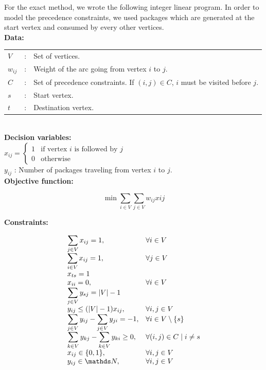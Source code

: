 \documentclass[]{article}
\begin{document}
    For the exact method, we wrote the following integer linear program. In order to model the precedence constraints, we used packages which are generated at the start vertex and consumed by every other vertices.\\
    
    \textbf{Data:}\\
    
    \begin{tabular}{lll}
	    $V$ & : & Set of vertices.\\ 
	    $w_{ij}$ & : & Weight of the arc going from vertex $i$ to $j$.\\
	    $C$ & : & Set of precedence constraints. If $(i,j) \in C$, $i$ must be visited before $j$.\\
	    $s$ & : & Start vertex.\\
	    $t$ & : & Destination vertex.
	\end{tabular}\\
    
    \textbf{Decision variables:}\\
    
    $x_{ij} = \begin{cases}
	    1 & \text{if vertex } i \text{ is followed by } j\\
	    0 & \text{otherwise}
    \end{cases}$\\
    
    $y_{ij}$ : Number of packages traveling from vertex $i$ to $j$.\\
    
    \textbf{Objective function:}
    
    $$\min \sum_{i \in V}\sum_{j \in V} w_{ij} x{ij}$$
    
    \textbf{Constraints:}

    $$\begin{array}{ll}
        \displaystyle\sum_{j \in V} x_{ij} = 1, & \forall i \in V\\
        \displaystyle\sum_{i \in V} x_{ij} = 1, & \forall j \in V\\
        x_{ts} = 1 &\\
        x_{ii} = 0, & \forall i \in V\\
        \displaystyle\sum_{j \in V} y_{sj} = |V| - 1&\\
        y_{ij} \le (|V| - 1) x_{ij}, & \forall i, j \in V\\
        \displaystyle\sum_{j \in V} y_{ij} - \displaystyle\sum_{j \in V} y_{ji} = -1, & \forall i \in V\setminus\{s\}\\
        \displaystyle\sum_{k \in V} y_{kj} - \displaystyle\sum_{k \in V} y_{ki} \ge 0, & \forall (i,j) \in C \mid i \ne s\\
        x_{ij} \in \{0, 1\}, & \forall i,j \in V\\
        y_{ij} \in \N, & \forall i,j \in V\\
    \end{array}$$\\
    
\end{document}
